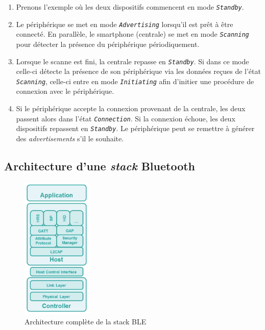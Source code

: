 \begin{enumerate}
    \item Prenons l'exemple où les deux dispositifs commencent en mode \texttt{\textit{Standby}}.
    \item Le périphérique se met en mode \texttt{\textit{Advertising}} lorsqu'il est prêt à être connecté. En parallèle, le smartphone (centrale) se met en mode \texttt{\textit{Scanning}} pour détecter la présence du périphérique périodiquement. 
    \item Lorsque le scanne est fini, la centrale repasse en \texttt{\textit{Standby}}. Si dans ce mode celle-ci détecte la présence de son périphérique via les données reçues de l'état \texttt{\textit{Scanning}}, celle-ci entre en mode \texttt{\textit{Initiating}} afin d'initier une procédure de connexion avec le périphérique.
    \item Si le périphérique accepte la connexion provenant de la centrale, les deux passent alors dans l'état \texttt{\textit{Connection}}. Si la connexion échoue, les deux dispositifs repassent en \texttt{\textit{Standby}}. Le périphérique peut se remettre à générer des \textit{advertisements} s'il le souhaite.
\end{enumerate}


\subsection{Architecture d'une \textit{stack} Bluetooth}

\begin{figure}[ht!]
    \centering
    \includegraphics[width=0.3\textwidth]{Figures/Protocols/Bluetooth/ble_full_stack_explained.PNG}
    \caption{Architecture complète de la stack BLE}
    \label{fig-ble_full_stack_explained}
\end{figure}

